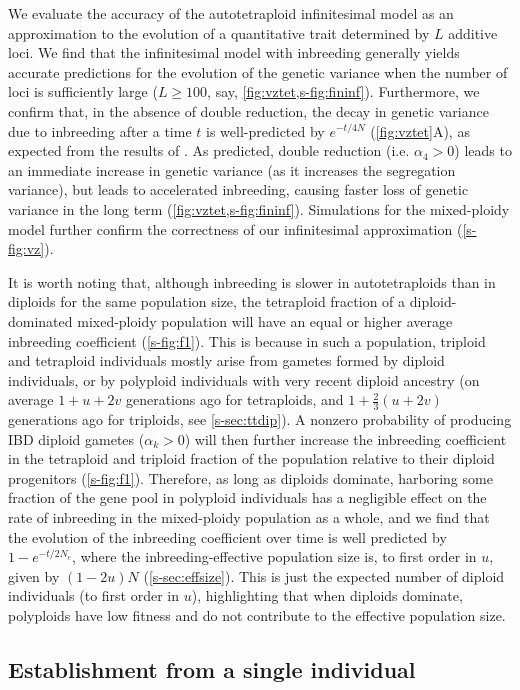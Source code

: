 \documentclass[12pt,a4paper]{article}
\begin{document}
We evaluate the accuracy of the autotetraploid infinitesimal model as an
approximation to the evolution of a quantitative trait determined by $L$
additive loci.
We find that the infinitesimal model with inbreeding generally yields accurate
predictions for the evolution of the genetic variance when the number of loci
is sufficiently large ($L \ge 100$, say, \cref{fig:vztet,s-fig:fininf}).
Furthermore, we confirm that, in the absence of double reduction, the decay in
genetic variance due to inbreeding after a time $t$ is well-predicted by
$e^{-t/4N}$ (\cref{fig:vztet}A), as expected from the results of \cite{arnold2012}.
As predicted, double reduction (i.e. $\alpha_4 > 0$) leads to an immediate
increase in genetic variance (as it increases the segregation variance), but
leads to accelerated inbreeding, causing faster loss of genetic variance in the
long term (\cref{fig:vztet,s-fig:fininf}).
Simulations for the mixed-ploidy model further confirm the correctness of our
infinitesimal approximation (\cref{s-fig:vz}).

It is worth noting that, although inbreeding is slower in autotetraploids than
in diploids for the same population size, the tetraploid fraction of a
diploid-dominated mixed-ploidy population will have an equal or higher average
inbreeding coefficient (\cref{s-fig:f1}).
This is because in such a population, triploid and tetraploid individuals
mostly arise from gametes formed by diploid individuals, or by polyploid
individuals with very recent diploid ancestry (on average $1+u+2v$ generations ago
for tetraploids, and $1+\frac{2}{3}(u+2v)$ generations ago for triploids, see
\cref{s-sec:ttdip}).
A nonzero probability of producing IBD diploid gametes ($\alpha_k > 0$) will
then further increase the inbreeding coefficient in the tetraploid and triploid
fraction of the population relative to their diploid progenitors
(\cref{s-fig:f1}).
Therefore, as long as diploids dominate, harboring some fraction of the gene
pool in polyploid individuals has a negligible effect on the rate of inbreeding
in the mixed-ploidy population as a whole, and we find that the evolution of
the inbreeding coefficient over time is well predicted by $1-e^{-t/2N_e}$,
where the inbreeding-effective population size is, to first order in $u$, given
by $(1-2u)N$ (\cref{s-sec:effsize}). This is just the expected number of
diploid individuals (to first order in $u$), highlighting that when diploids
dominate, polyploids have low fitness and do not contribute to the effective
population size. 


\subsection*{Establishment from a single individual}
\end{document}
